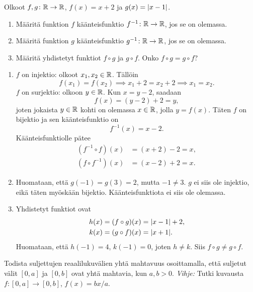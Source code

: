 \documentclass[11pt,a4paper]{amsart}
\begin{document}
\begin{exercise}
Olkoot \(f, g \colon \mathbb{R} \to \mathbb{R}\), \(f(x) = x + 2\) ja
\(g(x) = \lvert x - 1\rvert\).
\begin{enumerate}[label=\alph*), nosep]
\item Määritä funktion \(f\) käänteisfunktio
\(f^{-1} \colon \mathbb{R} \to \mathbb{R}\), jos se on olemassa.
\item Määritä funktion \(g\) käänteisfunktio
\(g^{-1} \colon \mathbb{R} \to \mathbb{R}\), jos se on olemassa.
\item Määritä yhdistetyt funktiot \(f \circ g\) ja \(g \circ f\).
Onko \(f \circ g = g \circ f\)?
\end{enumerate}
\end{exercise}

\begin{solution}
\leavevmode\par
\begin{enumerate}[label=\alph*), nosep]
\item \(f\) on injektio: olkoot \(x_1, x_2 \in \mathbb{R}\). Tällöin
\[
f(x_1) = f(x_2) \implies x_1 + 2 = x_2 + 2 \implies x_1 = x_2.
\]
\(f\) on surjektio: olkoon \(y \in \mathbb{R}\). Kun \(x = y - 2\), saadaan
\[
f(x) = (y - 2) + 2 = y,
\]
joten jokaista \(y \in \mathbb{R}\) kohti on olemassa \(x \in \mathbb{R}\), jolla
\(y = f(x)\). Täten \(f\) on bijektio ja sen käänteisfunktio on
\[
f^{-1}(x) = x - 2.
\]
Käänteisfunktiolle pätee
\[
\begin{aligned}
(f^{-1} \circ f)(x) &= (x + 2) - 2 = x, \\
(f \circ f^{-1})(x) &= (x - 2) + 2 = x.
\end{aligned}
\]
\item Huomataan, että \(g(-1) = g(3) = 2\), mutta \(-1 \neq 3\). \(g\) ei siis
ole injektio, eikä täten myöskään bijektio. Käänteisfunktiota ei siis ole
olemassa.
\item Yhdistetyt funktiot ovat
\[
\begin{aligned}
h(x) = (f \circ g)(x) &= \lvert x - 1\rvert + 2, \\
k(x) = (g \circ f)(x) &= \lvert x + 1\rvert.
\end{aligned}
\]
Huomataan, että \(h(-1) = 4\), \(k(-1) = 0\), joten \(h \neq k\).
Siis \(f \circ g \neq g \circ f\).\qedhere
\end{enumerate}
\end{solution}

\begin{exercise}
Todista suljettujen reaalilukuvälien yhtä mahtavuus osoittamalla, että
suljetut välit \([0, a]\) ja \([0, b]\) ovat yhtä mahtavia, kun
\(a, b > 0\). \emph{Vihje:} Tutki kuvausta
\(f \colon [0, a] \to [0, b]\), \(f(x) = bx/a\).
\end{exercise}
\end{document}
